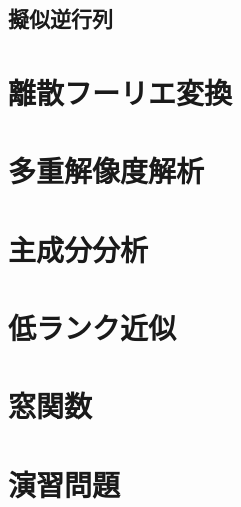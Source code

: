 \documentclass[../../main]{subfiles}
\begin{document}
\subsection{擬似逆行列}

\section{離散フーリエ変換}

\section{多重解像度解析}

\begin{subappendices}
\section{主成分分析}
\section{低ランク近似}
\section{窓関数}
\end{subappendices}

\section*{演習問題}
\end{document}
